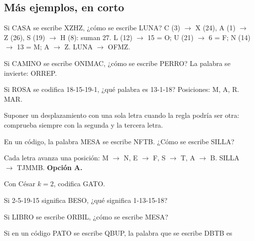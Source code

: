 \subsection{Más ejemplos, en corto}
\begin{ejemplo}
Si CASA se escribe XZHZ, ¿cómo se escribe LUNA?
\solucion C (3) $\to$ X (24), A (1) $\to$ Z (26), S (19) $\to$ H (8): suman 27. L (12) $\to$ 15 = O; U (21) $\to$ 6 = F;
N (14) $\to$ 13 = M; A $\to$ Z. LUNA $\to$ OFMZ.
\end{ejemplo}

\begin{ejemplo}[De posición]
Si CAMINO se escribe ONIMAC, ¿cómo se escribe PERRO?
\solucion La palabra se invierte: ORREP.
\end{ejemplo}

\begin{ejemplo}[Números]
Si ROSA se codifica 18-15-19-1, ¿qué palabra es 13-1-18?
\solucion Posiciones: M, A, R. MAR.
\end{ejemplo}

\begin{trampa}
Suponer un desplazamiento con una sola letra cuando la regla podría ser otra: comprueba siempre con la segunda y la
tercera letra.
\end{trampa}

\begin{reto}
En un código, la palabra MESA se escribe NFTB. ¿Cómo se escribe SILLA?
\end{reto}

\begin{retoresuelto}
Cada letra avanza una posición: M $\to$ N, E $\to$ F, S $\to$ T, A $\to$ B. SILLA $\to$ TJMMB. \textbf{Opción A.}
\end{retoresuelto}

\taller
{}
\begin{ejercicios}
\item Con César $k = 2$, codifica GATO. 
\item Si 2-5-19-15 significa BESO, ¿qué significa 1-13-15-18? 
\item Si LIBRO se escribe ORBIL, ¿cómo se escribe MESA? 
\end{ejercicios}
\begin{ejercicios}
\item Si en un código PATO se escribe QBUP, la palabra que se escribe DBTB es
\end{ejercicios}

